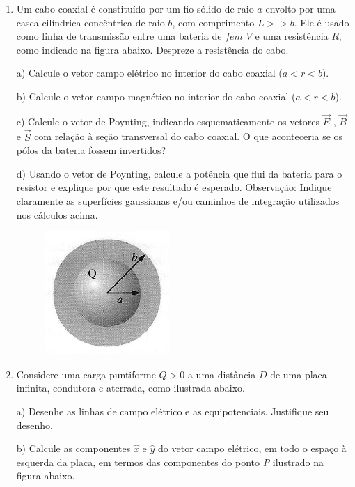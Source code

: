 \begin{enumerate}[start=1,label={\bfseries Q\arabic*.}]
\resposta


\item Um cabo coaxial é constituído por um fio sólido de raio $a$ envolto por uma casca cilíndrica concêntrica de raio $b$, com comprimento $L >> b$. Ele é usado como linha de transmissão entre uma bateria de $fem$ $V$ e uma resistência $R$, como indicado na figura abaixo. Despreze a resistência do cabo.

a) Calcule o vetor campo elétrico no interior do cabo coaxial ($a < r < b$).

\resposta

b) Calcule o vetor campo magnético no interior do cabo coaxial ($a < r < b$).

\resposta

c) Calcule o vetor de Poynting, indicando esquematicamente os vetores $\vec{E}$ , $\vec{B}$ e $\vec{S}$ com relação à seção transversal do cabo coaxial. O que aconteceria se os pólos da bateria fossem invertidos?

\resposta

d) Usando o vetor de Poynting, calcule a potência que flui da bateria para o resistor e explique por que este resultado é esperado. Observação: Indique claramente as superfícies gaussianas e/ou caminhos de integração utilizados nos cálculos acima.

\begin{figure}[H]
\centering
\includegraphics[scale=0.8]{eletromag-img/esfera2.png}
\end{figure}


\item Considere uma carga puntiforme $Q > 0$ a uma distância $D$ de uma placa infinita, condutora e aterrada, como ilustrada abaixo.

a) Desenhe as linhas de campo elétrico e as equipotenciais. Justifique seu desenho.

\resposta

b) Calcule as componentes $\hat{x}$ e $\hat{y}$ do vetor campo elétrico, em todo o espaço à esquerda da placa, em termos das componentes do ponto \textit{P} ilustrado na figura abaixo.


\end{enumerate}

